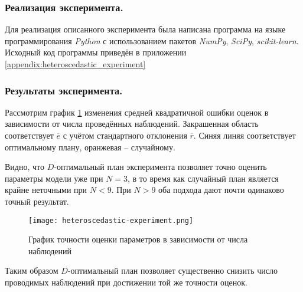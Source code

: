 \subsubsection{Реализация эксперимента.}
Для реализация описанного эксперимента была написана программа на языке программирования \textit{Python} с использованием пакетов \textit{NumPy}, \textit{SciPy}, \textit{scikit-learn}. Исходный код программы приведён в приложении \ref{appendix:heteroscedastic_experiment}

\subsubsection{Результаты эксперимента.}
Рассмотрим график \ref{fig:heteroscedastic-experiment} изменения средней квадратичной ошибки оценок в зависимости от числа проведённых наблюдений. Закрашенная область соответствует $\overline e$ с учётом стандартного отклонения $\overline r$. Синяя линяя соответствует оптимальному плану, оранжевая -- случайному.

Видно, что $D$-оптимальный план эксперимента позволяет точно оценить параметры модели уже при $N=3$, в то время как случайный план является крайне неточными при $N < 9$. При $N > 9$ оба подхода дают почти одинаково точный результат.

\begin{figure}[h]
	\centering
	\texttt{[image: heteroscedastic-experiment.png]}
	\caption {График точности оценки параметров в зависимости от числа наблюдений}
	\label{fig:heteroscedastic-experiment}
\end{figure}

Таким образом $D$-оптимальный план позволяет существенно снизить число проводимых наблюдений при достижении той же точности оценок.


